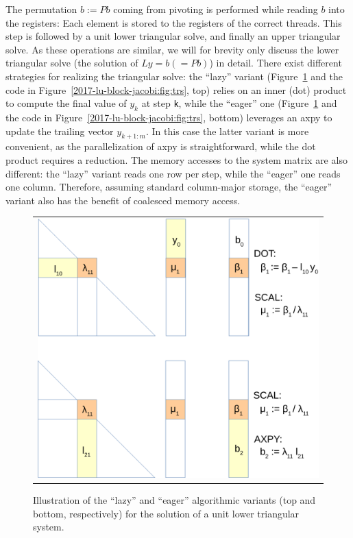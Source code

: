 The permutation $b := Pb$ coming from pivoting
is performed while reading $b$ into the registers:
Each element is stored to the registers of the correct threads.
This step is followed by a unit lower triangular solve, and finally an upper triangular solve.
As these operations are similar, we will for brevity only discuss 
the lower triangular solve (the solution of $Ly = b (= Pb)$) in detail.
There exist different strategies for realizing the triangular solve:
the ``lazy'' variant (Figure~\ref{2017-lu-block-jacobi:fig:trsfig} and the code in Figure~\ref{2017-lu-block-jacobi:fig:trs}, top) relies on an inner ({\sc dot}) product
to compute the final value of $y_k$ at step \texttt{k},
while the ``eager'' one (Figure~\ref{2017-lu-block-jacobi:fig:trsfig} and the code in Figure~\ref{2017-lu-block-jacobi:fig:trs}, bottom) leverages an {\sc axpy}
to update the trailing vector $y_{k+1:m}$.
In this case the latter variant is more convenient,
as the parallelization of {\sc axpy} is straightforward,
while the {\sc dot} product requires a reduction.
The memory accesses to the system matrix are also different:
the ``lazy'' variant reads one row per step,
while the ``eager'' one reads one column.
Therefore, assuming standard column-major storage,
the ``eager'' variant also has the benefit of coalesced memory access.

\begin{figure}
\begin{center}
\begin{tabular}{c}
\includegraphics[width=.7\columnwidth]{plots/lazy_eagar}
\end{tabular}
\end{center}
\caption{Illustration of the ``lazy'' and ``eager'' algorithmic variants (top and bottom, respectively)
    for the solution of a unit lower triangular system.}
\label{2017-lu-block-jacobi:fig:trsfig}
\end{figure}


